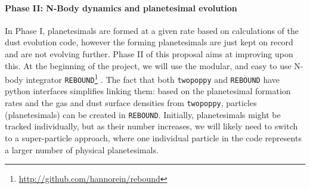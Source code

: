 \documentclass[10pt,fleqn,twoside]{article}
\newcommand{\twopoppy}{\texttt{twopoppy}\xspace}
\newcommand{\rebound}{\texttt{REBOUND}\xspace}
\begin{document}
% 

\paragraph{Phase II: N-Body dynamics and planetesimal evolution}
\label{sec:phaseII}

In Phase I, planetesimals are formed at a given rate based on
calculations of the dust evolution code, however the forming
planetesimals are just kept on record and are not evolving further.
Phase II of this proposal aims at improving upon this. At the
beginning of the project, we will use the modular, and easy to use
N-body integrator
\rebound\footnote{\url{http://github.com/hannorein/rebound}}
\citep{2012A&A...537A.128R}. The fact that both \twopoppy and \rebound
have python interfaces simplifies linking them: based on the
planetesimal formation rates and the gas and dust surface densities
from \twopoppy, particles (planetesimals) can be created in \rebound.
Initially, planetesimals might be tracked individually, but as their
number increases, we will likely need to switch to a super-particle
approach, where one individual particle in the code represents a
larger number of physical planetesimals.
\end{document}
